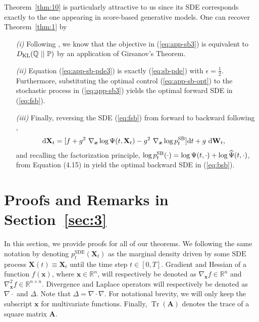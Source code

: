 \documentclass{article}
\def\eqref#1{(\ref{#1})}
\def\rd{{\textnormal{d}}}
\def\rvX{{\mathbf{X}}}
\def\vx{{\bm{x}}}
\def\mA{{\bm{A}}}
\newcommand{\KL}{D_{\mathrm{KL}}}
\DeclareMathOperator{\Tr}{Tr}
\def\wt{{ \mathbf{W}_t }}
\def\dwt{{ \mathrm{d} \wt }}
\def\dt{{ \mathrm{d} t }}
\begin{document}
    Theorem~\ref{thm:10} is particularly attractive to us since its SDE corresponds exactly to the one appearing in score-based generative models.
    One can recover Theorem~\ref{thm:1} by
    \begin{enumerate}[leftmargin=20pt]
        \item[\textit{(i)}] Following \citet{pavon1991free}, we know that the objective in \eqref{eq:app-sb3} is equivalent to $\KL(\QQ~||~\PP)$ by an application of Girsanov’s Theorem.
        \item[\textit{(ii)}] Equation \eqref{eq:app-sb-pde3} is exactly \eqref{eq:sb-pde} with $\epsilon=\frac{1}{2}$. Furthermore, substituting the optimal control \eqref{eq:app-sb-opt} to the stochastic process in \eqref{eq:app-sb3} yields the optimal forward SDE in \eqref{eq:fsb}.
        \item[\textit{(iii)}] Finally, reversing the SDE \eqref{eq:fsb} from forward to backward following \citet{anderson1982reverse},
        \begin{align}
            \rd \rvX_t &= [f + g^2~\nabla_\vx \log {\Psi}(t,\rvX_t) - g^2~\nabla_\vx \log \pp{t}{SB} ] \dt + g~\dwt,
        \end{align}
        and recalling the factorization principle,
        $\log p_{t}^{\text{\normalfont{SB}}}(\cdot) = \log\Psi(t,\cdot) + \log\widehat{\Psi}(t,\cdot)$,
        from Equation (4.15) in \citet{chen2021stochastic} yield the optimal backward SDE in \eqref{eq:bsb}.
    \end{enumerate}




\section{Proofs and Remarks in Section~\ref{sec:3}} \label{app:a}

In this section, we provide proofs for all of our theorems.
We following the same notation by denoting $p_{t}^{\mathrm{SDE}}(\rvX_t)$ as the marginal density driven by some $\mathrm{SDE}$ process $\rvX(t)\equiv \rvX_t$ until the time step $t\in[0,T]$.
Gradient and Hessian of a function $f(\vx)$, where $\vx \in \mathbb{R}^n$, will respectively be denoted as
$\nabla_\vx f \in \mathbb{R}^n $ and $\nabla^2_{\vx} f \in \mathbb{R}^{n\times n}$.
Divergence and Laplace operators will respectively be denoted as
$\nabla \cdot$ and $\Delta$.
Note that $\Delta = \nabla \cdot \nabla$.
For notational brevity, we will only keep the subscript $\vx$ for multivariate functions.
Finally,
$\Tr(\mA)$ denotes the trace of a square matrix $\mA$.
\end{document}
